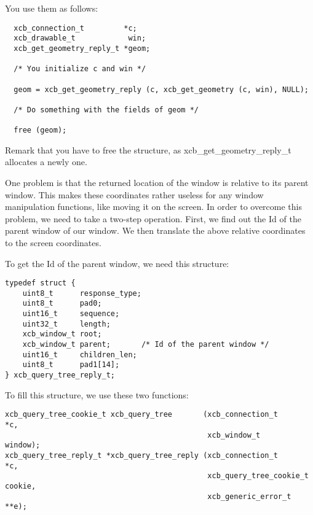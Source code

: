 \documentclass[12pt,oneside,titlepage]{book}
\begin{document}
\begin{enumerate}
\begin{enumerate}
    You use them as follows:

\begin{verbatim}
  xcb_connection_t         *c;
  xcb_drawable_t            win;
  xcb_get_geometry_reply_t *geom;

  /* You initialize c and win */

  geom = xcb_get_geometry_reply (c, xcb_get_geometry (c, win), NULL);

  /* Do something with the fields of geom */

  free (geom);
\end{verbatim}

    Remark that you have to free the structure, as
    {xcb\_get\_geometry\_reply\_t} allocates a newly one.

    One problem is that the returned location of the window is relative
    to its parent window. This makes these coordinates rather useless
    for any window manipulation functions, like moving it on the screen.
    In order to overcome this problem, we need to take a two-step
    operation. First, we find out the Id of the parent window of our
    window. We then translate the above relative coordinates to the
    screen coordinates.

    To get the Id of the parent window, we need this structure:

\begin{verbatim}
typedef struct {
    uint8_t      response_type;
    uint8_t      pad0;
    uint16_t     sequence;
    uint32_t     length;
    xcb_window_t root;
    xcb_window_t parent;       /* Id of the parent window */
    uint16_t     children_len;
    uint8_t      pad1[14];
} xcb_query_tree_reply_t;
\end{verbatim}

    To fill this structure, we use these two functions:

\begin{verbatim}
xcb_query_tree_cookie_t xcb_query_tree       (xcb_connection_t        *c,
                                              xcb_window_t             window);
xcb_query_tree_reply_t *xcb_query_tree_reply (xcb_connection_t        *c,
                                              xcb_query_tree_cookie_t  cookie,
                                              xcb_generic_error_t    **e);
\end{verbatim}


\end{enumerate}
\end{enumerate}
\end{document}
